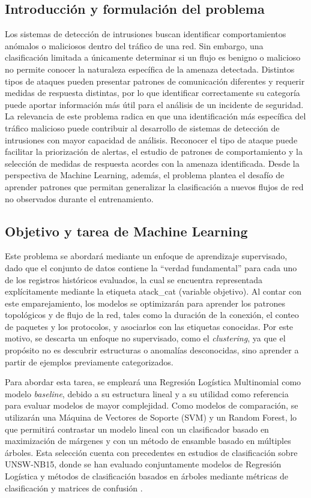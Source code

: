 \documentclass[conference]{IEEEtran}
\begin{document}
\subsection{Introducción y formulación del problema}
Los sistemas de detección de intrusiones buscan identificar comportamientos anómalos o maliciosos dentro del tráfico de una red. Sin embargo, una clasificación limitada a únicamente determinar si un flujo es benigno o malicioso no permite conocer la naturaleza específica de la amenaza detectada. Distintos tipos de ataques pueden presentar patrones de comunicación diferentes y requerir medidas de respuesta distintas, por lo que identificar correctamente su categoría puede aportar información más útil para el análisis de un incidente de seguridad.
La relevancia de este problema radica en que una identificación más específica del tráfico malicioso puede contribuir al desarrollo de sistemas de detección de intrusiones con mayor capacidad de análisis. Reconocer el tipo de ataque puede facilitar la priorización de alertas, el estudio de patrones de comportamiento y la selección de medidas de respuesta acordes con la amenaza identificada. Desde la perspectiva de Machine Learning, además, el problema plantea el desafío de aprender patrones que permitan generalizar la clasificación a nuevos flujos de red no observados durante el entrenamiento.


\subsection{Objetivo y tarea de Machine Learning}

Este problema se abordará mediante un enfoque de aprendizaje supervisado, dado que el conjunto de datos contiene la ``verdad fundamental'' para cada uno de los registros históricos evaluados, la cual se encuentra representada explícitamente mediante la etiqueta atack\_cat (variable objetivo). Al contar con este emparejamiento, los modelos se optimizarán para aprender los patrones topológicos y de flujo de la red, tales como la duración de la conexión, el conteo de paquetes y los protocolos, y asociarlos con las etiquetas conocidas. Por este motivo, se descarta un enfoque no supervisado, como el \textit{clustering}, ya que el propósito no es descubrir estructuras o anomalías desconocidas, sino aprender a partir de ejemplos previamente categorizados.

Para abordar esta tarea, se empleará una Regresión Logística Multinomial como modelo \textit{baseline}, debido a su estructura lineal y a su utilidad como referencia para evaluar modelos de mayor complejidad. Como modelos de comparación, se utilizarán una Máquina de Vectores de Soporte (SVM) y un Random Forest, lo que permitirá contrastar un modelo lineal con un clasificador basado en maximización de márgenes y con un método de ensamble basado en múltiples árboles. Esta selección cuenta con precedentes en estudios de clasificación sobre UNSW-NB15, donde se han evaluado conjuntamente modelos de Regresión Logística y métodos de clasificación basados en árboles mediante métricas de clasificación y matrices de confusión \cite{more2024enhanced}.
\end{document}
